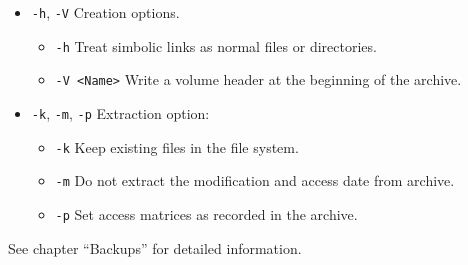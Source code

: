             \begin{itemize}
             \item {\tt -h}, {\tt -V}\newline
               Creation options.

               \begin{itemize}
               \item {\tt -h}\newline
                 Treat simbolic links as normal files or directories.

               \item {\tt -V <Name>}\newline
                 Write a volume header at the beginning of the archive.
               \end{itemize}

             \item {\tt -k}, {\tt -m}, {\tt -p}\newline
               Extraction option:

               \begin{itemize}
               \item {\tt -k}\newline
                 Keep existing files in the file system.

               \item {\tt -m}\newline
                 Do not extract the modification and access date from archive.

               \item {\tt -p}\newline
                 Set access matrices as recorded in the archive.
               \end{itemize}
             \end{itemize}

             See chapter ``Backups'' for detailed information.
\newpage